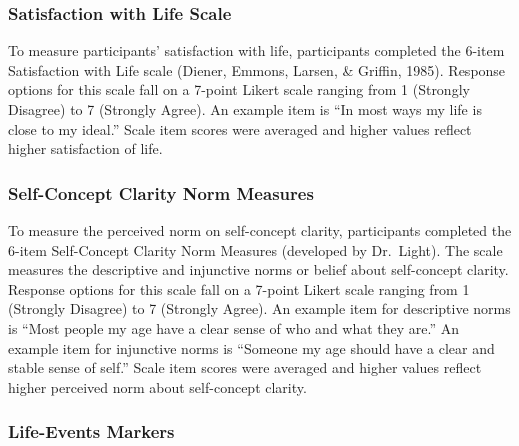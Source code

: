 \documentclass[
  man,floatsintext]{apa6}
\begin{document}
\hypertarget{satisfaction-with-life-scale}{%
\subsubsection{Satisfaction with Life Scale}\label{satisfaction-with-life-scale}}

To measure participants' satisfaction with life, participants completed the 6-item Satisfaction with Life scale (Diener, Emmons, Larsen, \& Griffin, 1985). Response options for this scale fall on a 7-point Likert scale ranging from 1 (Strongly Disagree) to 7 (Strongly Agree). An example item is ``In most ways my life is close to my ideal.'' Scale item scores were averaged and higher values reflect higher satisfaction of life.

\hypertarget{self-concept-clarity-norm-measures}{%
\subsubsection{Self-Concept Clarity Norm Measures}\label{self-concept-clarity-norm-measures}}

To measure the perceived norm on self-concept clarity, participants completed the 6-item Self-Concept Clarity Norm Measures (developed by Dr.~Light). The scale measures the descriptive and injunctive norms or belief about self-concept clarity. Response options for this scale fall on a 7-point Likert scale ranging from 1 (Strongly Disagree) to 7 (Strongly Agree). An example item for descriptive norms is ``Most people my age have a clear sense of who and what they are.'' An example item for injunctive norms is ``Someone my age should have a clear and stable sense of self.'' Scale item scores were averaged and higher values reflect higher perceived norm about self-concept clarity.

\hypertarget{life-events-markers}{%
\subsubsection{Life-Events Markers}\label{life-events-markers}}
\end{document}
